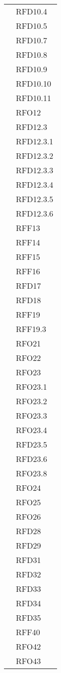 \begin{longtable}{|>{\centering}m{10cm}|m{3cm}<{\centering}|}
& RFD10.4\\
& RFD10.5\\
& RFD10.7\\
& RFD10.8\\
& RFD10.9\\
& RFD10.10\\
& RFD10.11\\
& RFO12\\
& RFD12.3\\
& RFD12.3.1\\
& RFD12.3.2\\
& RFD12.3.3\\
& RFD12.3.4\\
& RFD12.3.5\\
& RFD12.3.6\\
& RFF13\\
& RFF14\\
& RFF15\\
& RFF16\\
& RFD17\\
& RFD18\\
& RFF19\\
& RFF19.3\\
& RFO21\\
& RFO22\\
& RFO23\\
& RFO23.1\\
& RFO23.2\\
& RFO23.3\\
& RFO23.4\\
& RFD23.5\\
& RFD23.6\\
& RFO23.8\\
& RFO24\\
& RFO25\\
& RFO26\\
& RFD28\\
& RFD29\\
& RFD31\\
& RFD32\\
& RFD33\\
& RFD34\\
& RFD35\\
& RFF40\\
& RFO42\\
& RFO43\\ \hline


\end{longtable}
